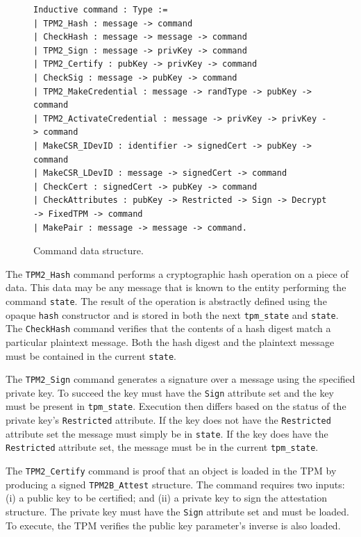 \documentclass[runningheads]{llncs}
\begin{document}
\begin{figure}[hbtp]
  \begin{footnotesize}
\begin{lstlisting}[language=Coq]
Inductive command : Type :=
| TPM2_Hash : message -> command
| CheckHash : message -> message -> command
| TPM2_Sign : message -> privKey -> command
| TPM2_Certify : pubKey -> privKey -> command
| CheckSig : message -> pubKey -> command
| TPM2_MakeCredential : message -> randType -> pubKey -> command
| TPM2_ActivateCredential : message -> privKey -> privKey -> command
| MakeCSR_IDevID : identifier -> signedCert -> pubKey -> command
| MakeCSR_LDevID : message -> signedCert -> command
| CheckCert : signedCert -> pubKey -> command
| CheckAttributes : pubKey -> Restricted -> Sign -> Decrypt -> FixedTPM -> command
| MakePair : message -> message -> command.
\end{lstlisting}
\end{footnotesize}
\caption{Command data structure.}
\label{fig:command-model}
\end{figure}

The \verb|TPM2_Hash| command performs a cryptographic hash operation
on a piece of data. This data may be any message that is known to the
entity performing the command \verb|state|. The result of the
operation is abstractly defined using the opaque \verb|hash|
constructor and is stored in both the next \verb|tpm_state| and
\verb|state|.  The \verb|CheckHash| command verifies
that the contents of a hash digest match a particular plaintext
message. Both the hash digest and the plaintext message must be
contained in the current \verb|state|.

The \verb|TPM2_Sign| command generates a signature over a message
using the specified private key.  To succeed the key must have the
\verb|Sign| attribute set and the key must be present in
\verb|tpm_state|. Execution then differs based on the status of the
private key's \verb|Restricted| attribute. If the key does not have
the \verb|Restricted| attribute set the message must simply be in
\verb|state|. If the key does have the \verb|Restricted| attribute
set, the message must be in the current \verb|tpm_state|.

The \verb|TPM2_Certify| command is proof that an object is loaded in
the TPM by producing a signed \verb|TPM2B_Attest| structure. The
command requires two inputs: (i) a public key to be certified; and
(ii) a private key to sign the attestation structure. The private key
must have the \verb|Sign| attribute set and must be loaded. To
execute, the TPM verifies the public key parameter's inverse is also
loaded.
\end{document}
